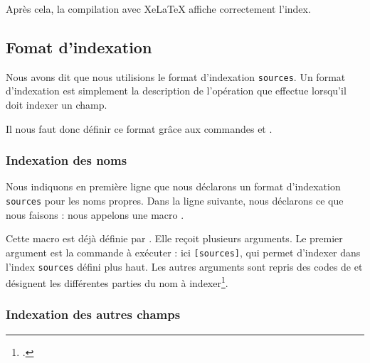 Après cela, la compilation avec XeLaTeX affiche correctement l'index.

\subsection{Fomat d'indexation }

Nous avons dit que nous utilisions le format d'indexation \verb|sources|. Un format d'indexation   est simplement la description de l'opération que  effectue lorsqu'il doit indexer un champ. 

Il nous faut donc définir ce format grâce aux commandes  et .

\subsubsection{Indexation des noms}

\begin{english}
\begin{latexcode}
\end{latexcode}
\end{english}

Nous indiquons en première ligne que nous déclarons un format d'indexation \verb|sources| pour les noms propres. Dans la ligne suivante, nous déclarons ce que nous faisons : nous appelons une macro . 

Cette macro est déjà définie par . Elle reçoit plusieurs arguments. Le premier argument est la commande à exécuter : ici \verb|[sources]|, qui permet d'indexer dans l'index \verb|sources| défini plus haut. Les autres arguments sont repris des codes de  et désignent les différentes parties du nom à indexer\footcite[Nous renvoyons le lecteur à la documentation de  : ][]{biblatex_formats}.


\subsubsection{Indexation des autres champs}

\begin{latexcode}
\end{latexcode}

